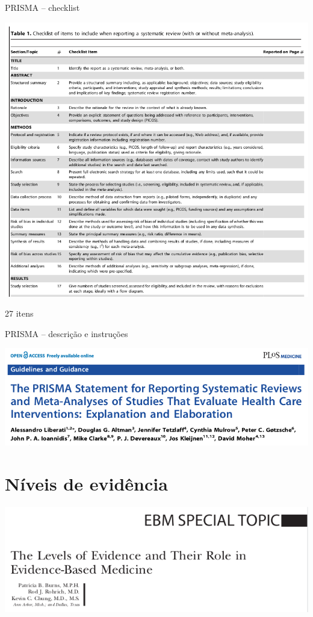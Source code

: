 \documentclass{beamer}
\begin{document}
\begin{frame}{PRISMA -- checklist}
  \begin{center}
    \includegraphics[height=.8\textheight]{Metodos/PRISMA-checklist}

    \bigskip
    \vfill
    \tiny
    27 itens
  \end{center}
\end{frame}

\begin{frame}{PRISMA -- descrição e instruções}
  \begin{center}
    \includegraphics[width=\textwidth]{Metodos/PRISMA-tit}
  \end{center}
\end{frame}

\section{Níveis de evidência}

\begin{frame}
  \begin{center}
    \includegraphics[width=1.1\textwidth]{Metodos/ebm-tit}
  \end{center}
\end{frame}
\end{document}
